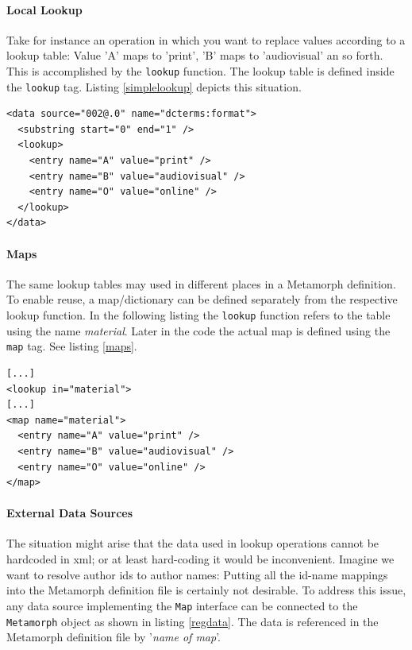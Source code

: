 \documentclass[12pt,a4paper]{article}
\begin{document}
\paragraph{Local Lookup}

Take for instance an operation in which you want to replace values according to a lookup table: Value 'A' maps to 'print', 'B' maps to 'audiovisual' an so forth. This is accomplished by the {\tt lookup} function. The lookup table is defined inside the {\tt lookup} tag. Listing \ref{simplelookup} depicts this situation.

\begin{lstlisting}[float=htb, label=simplelookup,caption=Performing a simple lookup operation]
<data source="002@.0" name="dcterms:format">
  <substring start="0" end="1" />
  <lookup>
    <entry name="A" value="print" />
    <entry name="B" value="audiovisual" />
    <entry name="O" value="online" />
  </lookup>
</data>	
\end{lstlisting}

\paragraph{Maps}

The same lookup tables may used in different places in a Metamorph definition. To enable reuse, a map/dictionary can be defined separately from the respective lookup function. In the following listing the {\tt lookup} function refers to the table using the name {\it material}. Later in the code the actual map is defined using the {\tt map} tag. See listing \ref{maps}.

\begin{lstlisting}[float=htb, label=maps,caption={Defining a standalone map, which can be independently addressed by different lookup functions.}]
[...]
<lookup in="material">
[...]
<map name="material">
  <entry name="A" value="print" />
  <entry name="B" value="audiovisual" />
  <entry name="O" value="online" />
</map>
\end{lstlisting}

\paragraph{External Data Sources}

The situation might arise that the data used in lookup operations cannot be hardcoded in xml; or at least hard-coding it would be inconvenient. Imagine we want to resolve author ids to author names: Putting all the id-name mappings into the Metamorph definition file is certainly not desirable.
To address this issue, any data source implementing the {\tt Map} interface can be connected to the {\tt Metamorph} object as shown in listing \ref{regdata}. The data is referenced in the Metamorph definition file by '{\it name of map}'.
\end{document}
